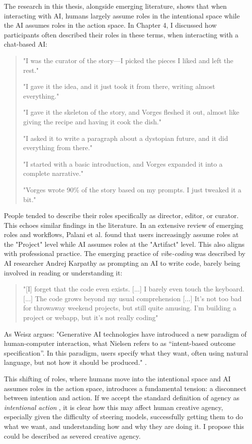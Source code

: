 The research in this thesis, alongside emerging literature, shows that when interacting with AI, humans largely assume roles in the intentional space while the AI assumes roles in the action space. In Chapter 4, I discussed how participants often described their roles in these terms, when interacting with a chat-based AI:
\begin{quote}
"I was the curator of the story—I picked the pieces I liked and left the rest."

"I gave it the idea, and it just took it from there, writing almost everything."

"I gave it the skeleton of the story, and Vorges fleshed it out, almost like giving the recipe and having it cook the dish." 

"I asked it to write a paragraph about a dystopian future, and it did everything from there." 

"I started with a basic introduction, and Vorges expanded it into a complete narrative." 

"Vorges wrote 90\% of the story based on my prompts. I just tweaked it a bit."
\end{quote}
People tended to describe their roles specifically as director, editor, or curator. This echoes similar findings in the literature. In an extensive review of emerging roles and workflows, Palani et al. \cite{Palani2024-on} found that users increasingly assume roles at the "Project" level while AI assumes roles at the "Artifact" level. This also aligns with professional practice. The emerging practice of \textit{vibe-coding} was described by AI researcher Andrej Karpathy as prompting an AI to write code, barely being involved in reading or understanding it:
\begin{quote}
"[I] forget that the code even exists. [...] I barely even touch the keyboard. [...] The code grows beyond my usual comprehension [...] It's not too bad for throwaway weekend projects, but still quite amusing. I'm building a project or webapp, but it's not really coding"
\end{quote}
As Weisz argues: "Generative AI technologies have introduced a new paradigm of human-computer interaction, what Nielsen refers to as “intent-based outcome specification”. In this paradigm, users specify what they want, often using natural language, but not how it should be produced." \cite{Weisz2024-io}.

This shifting of roles, where humans move into the intentional space and AI assumes roles in the action space, introduces a fundamental tension: a disconnect between intention and action. If we accept the standard definition of agency as \textit{intentional action} \cite{Schlosser2019-jk}, it is clear how this may affect human creative agency, especially given the difficulty of steering models, successfully getting them to do what we want, and understanding how and why they are doing it. I propose this could be described as severed creative agency.

